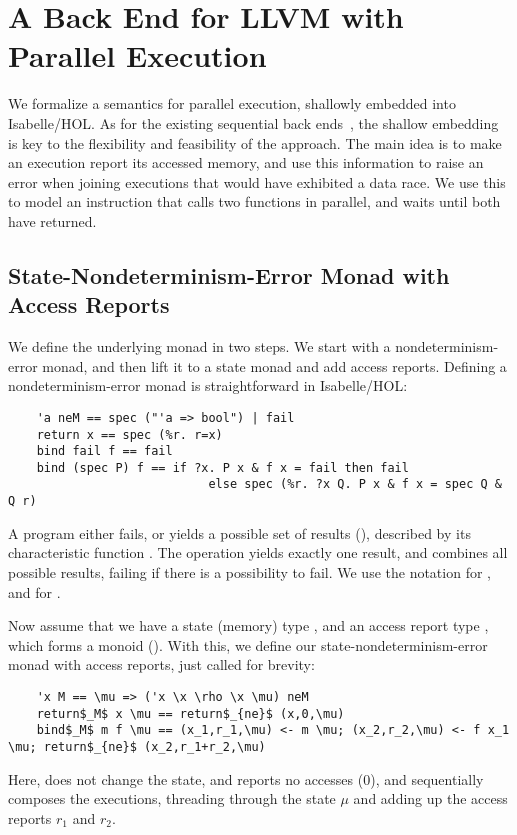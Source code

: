 \documentclass[sn-mathphys,Numbered]{sn-jnl}
\theoremstyle{thmstyleone}%
\theoremstyle{definition}%
\theoremstyle{thmstylethree}%
\begin{document}
\section{A Back End for LLVM with Parallel Execution}\label{sec:parsem}
  We formalize a semantics for parallel execution, shallowly embedded into Isabelle/HOL.
  As for the existing sequential back ends~\cite{La15,La19-llvm}, the shallow embedding is key
  to the flexibility and feasibility of the approach.
  The main idea is to make an execution report its accessed memory,
  and use this information to raise an error when joining executions that
  would have exhibited a data race. We use this to model an instruction that
  calls two functions in parallel, and waits until both have returned.

  \subsection{State-Nondeterminism-Error Monad with Access Reports}\label{sec:monad}
  We define the underlying monad in two steps. We start with a nondeterminism-error monad,
  and then lift it to a state monad and add access reports.
  Defining a nondeterminism-error monad is straightforward in Isabelle/HOL:
  \begin{lstlisting}
    'a neM == spec ("'a => bool") | fail
    return x == spec (%r. r=x)
    bind fail f == fail
    bind (spec P) f == if ?x. P x & f x = fail then fail
                            else spec (%r. ?x Q. P x & f x = spec Q & Q r)
  \end{lstlisting}
  A program either fails, or yields a possible set of results (), described by its characteristic function .
  The  operation yields exactly one result, and  combines all possible results,
  failing if there is a possibility to fail. We use the notation  for ,
  and  for .

  Now assume that we have a state (memory) type \is{\mu}, and an access report type \is{\rho}, which forms a monoid ().
  With this, we define our state-nondeterminism-error monad with access reports, just called  for brevity:
  \begin{lstlisting}
    'x M == \mu => ('x \x \rho \x \mu) neM
    return$_M$ x \mu == return$_{ne}$ (x,0,\mu)
    bind$_M$ m f \mu == (x_1,r_1,\mu) <- m \mu; (x_2,r_2,\mu) <- f x_1 \mu; return$_{ne}$ (x_2,r_1+r_2,\mu)
  \end{lstlisting}
  Here,  does not change the state, and reports no accesses (\is$0$),
  and  sequentially composes the executions, threading through the state $\mu$ and adding up the access reports \is$r_1$ and \is$r_2$.
\end{document}
